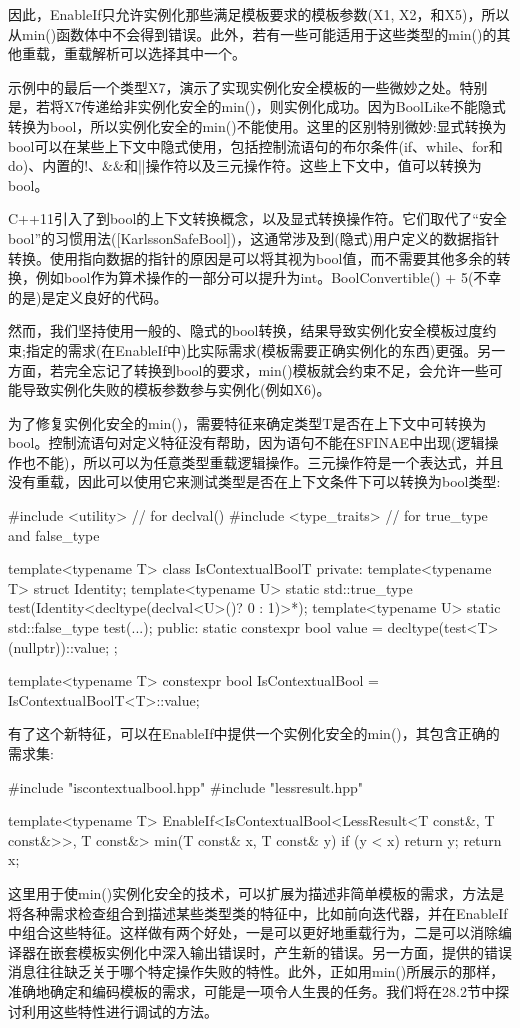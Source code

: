 因此，EnableIf只允许实例化那些满足模板要求的模板参数(X1, X2，和X5)，所以从min()函数体中不会得到错误。此外，若有一些可能适用于这些类型的min()的其他重载，重载解析可以选择其中一个。

示例中的最后一个类型X7，演示了实现实例化安全模板的一些微妙之处。特别是，若将X7传递给非实例化安全的min()，则实例化成功。因为BoolLike不能隐式转换为bool，所以实例化安全的min()不能使用。这里的区别特别微妙:显式转换为bool可以在某些上下文中隐式使用，包括控制流语句的布尔条件(if、while、for和do)、内置的!、\&\&和||操作符以及三元操作符。这些上下文中，值可以转换为bool。

\begin{notice}
C++11引入了到bool的上下文转换概念，以及显式转换操作符。它们取代了“安全bool”的习惯用法([KarlssonSafeBool])，这通常涉及到(隐式)用户定义的数据指针转换。使用指向数据的指针的原因是可以将其视为bool值，而不需要其他多余的转换，例如bool作为算术操作的一部分可以提升为int。BoolConvertible() + 5(不幸的是)是定义良好的代码。
\end{notice}

然而，我们坚持使用一般的、隐式的bool转换，结果导致实例化安全模板过度约束;指定的需求(在EnableIf中)比实际需求(模板需要正确实例化的东西)更强。另一方面，若完全忘记了转换到bool的要求，min()模板就会约束不足，会允许一些可能导致实例化失败的模板参数参与实例化(例如X6)。

为了修复实例化安全的min()，需要特征来确定类型T是否在上下文中可转换为bool。控制流语句对定义特征没有帮助，因为语句不能在SFINAE中出现(逻辑操作也不能)，所以可以为任意类型重载逻辑操作。三元操作符是一个表达式，并且没有重载，因此可以使用它来测试类型是否在上下文条件下可以转换为bool类型:

\begin{cpp}
#include <utility> // for declval()
#include <type_traits> // for true_type and false_type

template<typename T>
class IsContextualBoolT {
	private:
	template<typename T> struct Identity;
	template<typename U> static std::true_type
		test(Identity<decltype(declval<U>()? 0 : 1)>*);
	template<typename U> static std::false_type
		test(...);
	public:
	static constexpr bool value = decltype(test<T>(nullptr))::value;
};

template<typename T>
constexpr bool IsContextualBool = IsContextualBoolT<T>::value;
\end{cpp}

有了这个新特征，可以在EnableIf中提供一个实例化安全的min()，其包含正确的需求集:

\begin{cpp}
#include "iscontextualbool.hpp"
#include "lessresult.hpp"

template<typename T>
EnableIf<IsContextualBool<LessResult<T const&, T const&>>,
		T const&>
min(T const& x, T const& y)
{
	if (y < x) {
		return y;
	}
	return x;
}
\end{cpp}

这里用于使min()实例化安全的技术，可以扩展为描述非简单模板的需求，方法是将各种需求检查组合到描述某些类型类的特征中，比如前向迭代器，并在EnableIf中组合这些特征。这样做有两个好处，一是可以更好地重载行为，二是可以消除编译器在嵌套模板实例化中深入输出错误时，产生新的错误。另一方面，提供的错误消息往往缺乏关于哪个特定操作失败的特性。此外，正如用min()所展示的那样，准确地确定和编码模板的需求，可能是一项令人生畏的任务。我们将在28.2节中探讨利用这些特性进行调试的方法。






